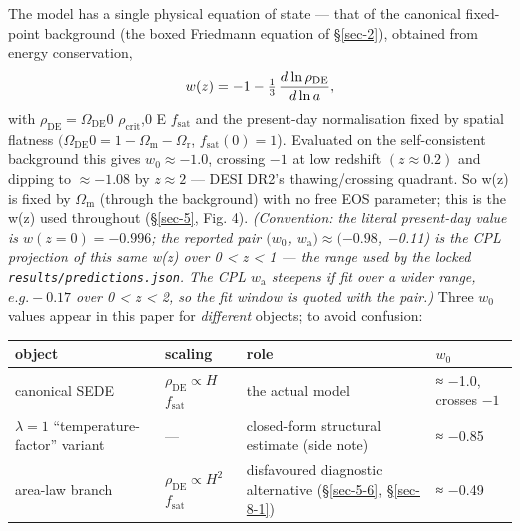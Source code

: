 \documentclass[preprint,12pt]{elsarticle}
\begin{document}
The model has a single physical equation of state --- that of the
canonical fixed-point background (the boxed Friedmann equation of
§\ref{sec-2}), obtained from energy conservation,
\begin{equation}w(z) = -1 - \tfrac13\,\frac{d\ln\rho_{\rm DE}}{d\ln a},\end{equation} with
\(\rho _\mathrm{DE} = \Omega _\mathrm{DE}0\) \(\rho _{\mathrm{crit}}\),0
E \(f_{\mathrm{sat}}\) and the present-day normalisation fixed by
spatial flatness
\((\Omega _\mathrm{DE}0 = 1 - \Omega _{\mathrm{m}} - \Omega _{\mathrm{r}}\),
\(f_{\mathrm{sat}}(0) = 1\)). Evaluated on the self-consistent
background this gives \(w_{0} \approx  -1.0\), crossing \(-1\) at low
redshift \((z \approx  0.2)\) and dipping to \(\approx  -1.08\) by
\(z \approx  2\) --- DESI DR2's thawing/crossing quadrant. So w(z) is
fixed by \(\Omega _{\mathrm{m}}\) (through the background) with no free
EOS parameter; this is the w(z) used throughout (§\ref{sec-5}, Fig. 4).
\emph{(Convention: the literal present-day value is \(w(z=0) = -0.996\);
the reported pair \((w_{0}\), \(w_{\mathrm{a}}) \approx  (-0.98\),
−0.11) is the CPL projection of this same w(z) over 0 \textless{} z
\textless{} 1 --- the range used by the locked
\texttt{results/\allowbreak predictions.\allowbreak json}. The CPL \(w_{\mathrm{a}}\) steepens
if fit over a wider range, \(e.g. -0.17\) over 0 \textless{} z
\textless{} 2, so the fit window is quoted with the pair.)} Three
\(w_{0}\) values appear in this paper for \emph{different} objects; to
avoid confusion:

\begin{longtable}[]{@{}
  >{\raggedright\arraybackslash}p{}
  >{\raggedright\arraybackslash}p{}
  >{\raggedright\arraybackslash}p{}
  >{\raggedright\arraybackslash}p{}@{}}
\toprule\noalign{}
\begin{minipage}[b]{\linewidth}\raggedright
object
\end{minipage} & \begin{minipage}[b]{\linewidth}\raggedright
scaling
\end{minipage} & \begin{minipage}[b]{\linewidth}\raggedright
role
\end{minipage} & \begin{minipage}[b]{\linewidth}\raggedright
\(w_{0}\)
\end{minipage} \\
\midrule\noalign{}
\endhead
\bottomrule\noalign{}
\endlastfoot
canonical SEDE & \(\rho _\mathrm{DE} \propto  H\) \(f_{\mathrm{sat}}\) &
the actual model & ≈ −1.0, crosses \(-1\) \\
\(\lambda =1\) ``temperature-factor'' variant & --- & closed-form
structural estimate (side note) & ≈ −0.85 \\
area-law branch & \(\rho _\mathrm{DE} \propto  H^{2}\)
\(f_{\mathrm{sat}}\) & disfavoured diagnostic alternative
(§\ref{sec-5-6}, §\ref{sec-8-1}) & ≈ −0.49 \\
\end{longtable}
\end{document}

